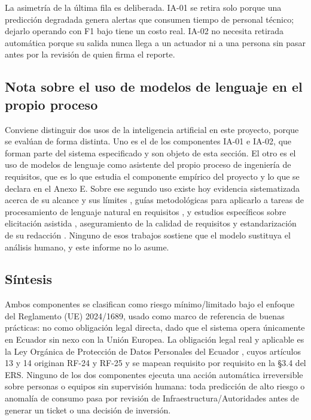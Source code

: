 La asimetr\'ia de la \'ultima fila es deliberada. IA-01 se retira solo porque una predicci\'on degradada genera alertas que consumen tiempo de personal t\'ecnico; dejarlo operando con F1 bajo tiene un costo real. IA-02 no necesita retirada autom\'atica porque su salida nunca llega a un actuador ni a una persona sin pasar antes por la revisi\'on de quien firma el reporte.

\subsection{Nota sobre el uso de modelos de lenguaje en el propio proceso}

Conviene distinguir dos usos de la inteligencia artificial en este proyecto, porque se eval\'uan de forma distinta. Uno es el de los componentes IA-01 e IA-02, que forman parte del sistema especificado y son objeto de esta secci\'on. El otro es el uso de modelos de lenguaje como asistente del propio proceso de ingenier\'ia de requisitos, que es lo que estudia el componente emp\'irico del proyecto y lo que se declara en el Anexo E. Sobre ese segundo uso existe hoy evidencia sistematizada acerca de su alcance y sus l\'imites \cite{cheng2026genai,arora2024advancing}, gu\'ias metodol\'ogicas para aplicarlo a tareas de procesamiento de lenguaje natural en requisitos \cite{vogelsang2024using}, y estudios espec\'ificos sobre elicitaci\'on asistida \cite{ronanki2023investigating,gorer2023generating}, aseguramiento de la calidad de requisitos \cite{lubos2024leveraging} y estandarizaci\'on de su redacci\'on \cite{ray2023agile}. Ninguno de esos trabajos sostiene que el modelo sustituya el an\'alisis humano, y este informe no lo asume.

\subsection{S\'intesis}

Ambos componentes se clasifican como riesgo m\'inimo/limitado bajo el enfoque del Reglamento (UE) 2024/1689, usado como marco de referencia de buenas pr\'acticas: no como obligaci\'on legal directa, dado que el sistema opera \'unicamente en Ecuador sin nexo con la Uni\'on Europea. La obligaci\'on legal real y aplicable es la Ley Org\'anica de Protecci\'on de Datos Personales del Ecuador \cite{asamblea2021lopdp}, cuyos art\'iculos 13 y 14 originan RF-24 y RF-25 y se mapean requisito por requisito en la \S3.4 del ERS. Ninguno de los dos componentes ejecuta una acci\'on autom\'atica irreversible sobre personas o equipos sin supervisi\'on humana: toda predicci\'on de alto riesgo o anomal\'ia de consumo pasa por revisi\'on de Infraestructura/Autoridades antes de generar un ticket o una decisi\'on de inversi\'on.
